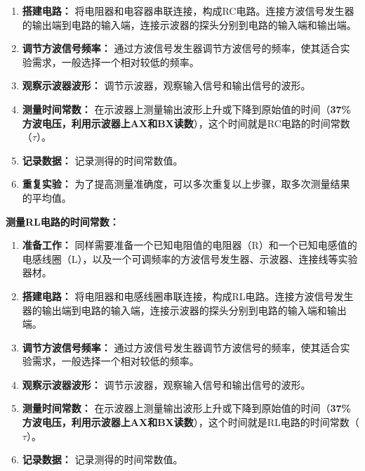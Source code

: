 \documentclass[dvipsnames, svgnames,a4paper,11pt]{article}
\begin{document}
\begin{enumerate}
\begin{enumerate}
\begin{enumerate}
				\item \textbf{搭建电路：} 将电阻器和电容器串联连接，构成RC电路。连接方波信号发生器的输出端到电路的输入端，连接示波器的探头分别到电路的输入端和输出端。
				
				\item \textbf{调节方波信号频率：} 通过方波信号发生器调节方波信号的频率，使其适合实验需求，一般选择一个相对较低的频率。
				
				\item \textbf{观察示波器波形：} 调节示波器，观察输入信号和输出信号的波形。
				
				\item \textbf{测量时间常数：} 在示波器上测量输出波形上升或下降到原始值的时间（\textbf{37\%方波电压，利用示波器上AX和BX读数}），这个时间就是RC电路的时间常数（$\tau$）。
				
				\item \textbf{记录数据：} 记录测得的时间常数值。
				
				\item \textbf{重复实验：} 为了提高测量准确度，可以多次重复以上步骤，取多次测量结果的平均值。
			\end{enumerate}
			
			\textbf{测量RL电路的时间常数：}
			
			\begin{enumerate}
				\item \textbf{准备工作：} 同样需要准备一个已知电阻值的电阻器（R）和一个已知电感值的电感线圈（L），以及一个可调频率的方波信号发生器、示波器、连接线等实验器材。
				
				\item \textbf{搭建电路：} 将电阻器和电感线圈串联连接，构成RL电路。连接方波信号发生器的输出端到电路的输入端，连接示波器的探头分别到电路的输入端和输出端。
				
				\item \textbf{调节方波信号频率：} 通过方波信号发生器调节方波信号的频率，使其适合实验需求，一般选择一个相对较低的频率。
				
				\item \textbf{观察示波器波形：} 调节示波器，观察输入信号和输出信号的波形。
				
				\item \textbf{测量时间常数：} 在示波器上测量输出波形上升或下降到原始值的时间（\textbf{37\%方波电压，利用示波器上AX和BX读数}），这个时间就是RL电路的时间常数（$\tau$）。
				
				\item \textbf{记录数据：} 记录测得的时间常数值。
				

\end{enumerate}
\end{enumerate}
\end{enumerate}
\end{document}
